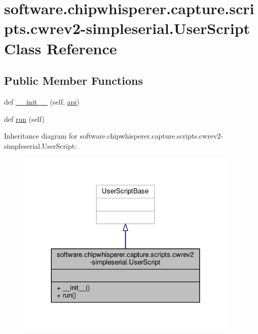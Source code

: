 \hypertarget{classsoftware_1_1chipwhisperer_1_1capture_1_1scripts_1_1cwrev2-simpleserial_1_1UserScript}{}\section{software.\+chipwhisperer.\+capture.\+scripts.\+cwrev2-\/simpleserial.User\+Script Class Reference}
\label{classsoftware_1_1chipwhisperer_1_1capture_1_1scripts_1_1cwrev2-simpleserial_1_1UserScript}
\subsection*{Public Member Functions}
\begin{DoxyCompactItemize}
\item 
def \hyperlink{classsoftware_1_1chipwhisperer_1_1capture_1_1scripts_1_1cwrev2-simpleserial_1_1UserScript_aa2f1def587837bd7c37d628e6b66ed64}{\+\_\+\+\_\+init\+\_\+\+\_\+} (self, \hyperlink{namespacesoftware_1_1chipwhisperer_1_1capture_1_1scripts_1_1cwrev2-simpleserial_a36e76f76504a84a1ed68d84e52ce89df}{api})
\item 
def \hyperlink{classsoftware_1_1chipwhisperer_1_1capture_1_1scripts_1_1cwrev2-simpleserial_1_1UserScript_a154f0a4d19996434fef7c17f78bfc8f9}{run} (self)
\end{DoxyCompactItemize}


Inheritance diagram for software.\+chipwhisperer.\+capture.\+scripts.\+cwrev2-\/simpleserial.User\+Script\+:\nopagebreak
\begin{figure}[H]
\begin{center}
\leavevmode
\includegraphics[width=299pt]{db/d9c/classsoftware_1_1chipwhisperer_1_1capture_1_1scripts_1_1cwrev2-simpleserial_1_1UserScript__inherit__graph}
\end{center}
\end{figure}


